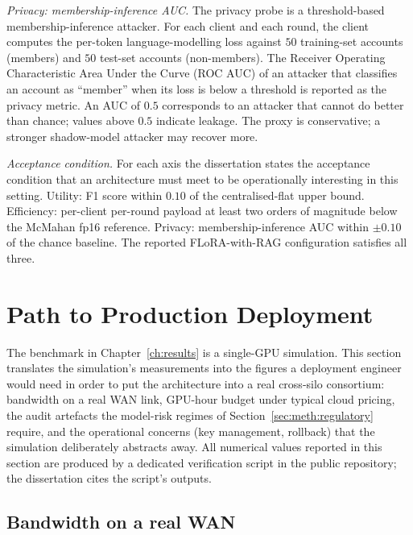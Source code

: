 \documentclass{report}
\begin{document}
\textit{Privacy: membership-inference AUC.} The privacy probe is a threshold-based membership-inference attacker. For each client and each round, the client computes the per-token language-modelling loss against $50$ training-set accounts (members) and $50$ test-set accounts (non-members). The Receiver Operating Characteristic Area Under the Curve (ROC AUC) of an attacker that classifies an account as ``member'' when its loss is below a threshold is reported as the privacy metric. An AUC of $0.5$ corresponds to an attacker that cannot do better than chance; values above $0.5$ indicate leakage. The proxy is conservative; a stronger shadow-model attacker may recover more.

\textit{Acceptance condition.} For each axis the dissertation states the acceptance condition that an architecture must meet to be operationally interesting in this setting. Utility: F1 score within $0.10$ of the centralised-flat upper bound. Efficiency: per-client per-round payload at least two orders of magnitude below the McMahan fp16 reference. Privacy: membership-inference AUC within $\pm 0.10$ of the chance baseline. The reported FLoRA-with-RAG configuration satisfies all three.

\section{Path to Production Deployment}
\label{sec:meth:production}

The benchmark in Chapter~\ref{ch:results} is a single-GPU simulation. This section translates the simulation's measurements into the figures a deployment engineer would need in order to put the architecture into a real cross-silo consortium: bandwidth on a real WAN link, GPU-hour budget under typical cloud pricing, the audit artefacts the model-risk regimes of Section~\ref{sec:meth:regulatory} require, and the operational concerns (key management, rollback) that the simulation deliberately abstracts away. All numerical values reported in this section are produced by a dedicated verification script in the public repository; the dissertation cites the script's outputs.

\subsection{Bandwidth on a real WAN}
\end{document}

